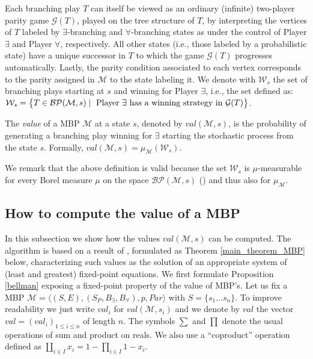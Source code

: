 Each branching play $T$ can itself be viewed as an ordinary (infinite) two-player parity game $\mathcal{G}(T)$, played on the tree structure of $T$,  by interpreting the vertices of $T$ labeled by $\exists$-branching and $\forall$-branching states as under the control of Player $\exists$ and Player $\forall$, respectively. All other states (i.e., those labeled by a probabilistic state) have a unique successor in $T$ to which the game $\mathcal{G}(T)$ progresses automatically. Lastly, the parity condition associated to each vertex corresponds to the parity assigned in $\mathcal{M}$ to the state labeling it.  We denote with $\mathcal{W}_s$ the set of branching plays starting at $s$ and winning for Player $\exists$, i.e., the set defined as: $\mathcal{W}_s = \big\{ T \in \mathcal{BP}(\mathcal{M},s) \mid \textnormal{ Player $\exists$ has a winning strategy in }\mathcal{G}(T) \big\}$.

\begin{definition}
The \emph{value} of a MBP $\mathcal{M}$ at a state $s$, denoted by $val(\mathcal{M},s)$, is the probability of generating a branching play winning for $\exists$ starting the stochastic process from the state $s$. Formally, $val(\mathcal{M},s)= \mu_{\mathcal{M}}(\mathcal{W}_s)$.
\end{definition}

We remark that the above definition is valid because the set $\mathcal{W}_s$ is $\mu$-measurable for every Borel measure $\mu$ on the space $\mathcal{BP}(\mathcal{M},s)$ (\cite{GMMS2014}) and thus also for $\mu_{\mathcal{M}}$. 

\subsection{How to compute the value of a MBP}\label{subsection_howto_compute}
In this subsection we show how the values  $val(\mathcal{M},s)$ can be computed. The algorithm is based on a result of \cite{MioThesis,MIO2012b}, formulated as Theorem \ref{main_theorem_MBP} below, characterizing such values as the solution of an appropriate system of (least and greatest) fixed-point equations. We first formulate Proposition \ref{bellman} exposing a fixed-point property of the value of MBP's. Let us fix a MBP $\mathcal{M}\!=\!\langle (S,E), (S_{P}, B_\exists,B_\forall), p , Par \rangle$ with $S\!=\! \{s_1\dots s_n\}$. 
To improve readability we just write $val_i$ for $val(\mathcal{M},s_i)$ and we denote by $val$ the vector  $val\!=\!(val_i)_{1\leq i \leq n}$ of length $n$. The symbols $\sum$ and $\prod$ denote the usual operations of sum and product on reals. We also use a ``coproduct'' operation defined as  $\coprod_{i\in I}x_i \!= \!  1-\prod_{i\in I }1-x_i$. 


